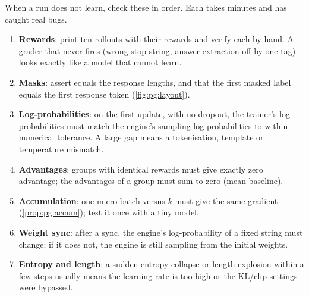When a run does not learn, check these in order. Each takes minutes and has caught real
bugs.
\begin{enumerate}
\item \textbf{Rewards}: print ten rollouts with their rewards and verify each by hand. A
  grader that never fires (wrong stop string, answer extraction off by one tag) looks
  exactly like a model that cannot learn.
\item \textbf{Masks}: assert  equals the response lengths, and that
  the first masked label equals the first response token (\cref{fig:pg:layout}).
\item \textbf{Log-probabilities}: on the first update, with no dropout, the trainer's
  log-probabilities must match the engine's sampling log-probabilities to within numerical
  tolerance. A large gap means a tokenisation, template or temperature mismatch.
\item \textbf{Advantages}: groups with identical rewards must give exactly zero advantage; the
  advantages of a group must sum to zero (mean baseline).
\item \textbf{Accumulation}: one micro-batch versus $k$ must give the same gradient
  (\cref{prop:pg:accum}); test it once with a tiny model.
\item \textbf{Weight sync}: after a sync, the engine's log-probability of a fixed string must
  change; if it does not, the engine is still sampling from the initial weights.
\item \textbf{Entropy and length}: a sudden entropy collapse or length explosion within a few
  steps usually means the learning rate is too high or the KL/clip settings were bypassed.
\end{enumerate}

